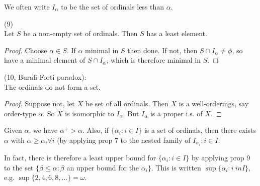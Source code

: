 \documentclass[a4paper]{article}
\begin{document}
We often write $I_\alpha$ to be the set of ordinals less than $\alpha$.

\begin{prop} (9)\\
Let $S$ be a non-empty set of ordinals. Then $S$ has a least element.
\begin{proof}
Choose $\alpha \in S$. If $\alpha$ minimal in $S$ then done. If not, then $S \cap I_\alpha \neq \phi$, so have a minimal element of $S\cap I_\alpha$, which is therefore minimal in $S$.
\end{proof}
\end{prop}

\begin{thm} (10, Burali-Forti paradox):\\
The ordinals do not form a set.
\begin{proof}
Suppose not, let $X$ be set of all ordinals. Then $X$ is a well-orderings, say order-type $\alpha$. So $X$ is isomorphic to $I_\alpha$. But $I_\alpha$ is a proper i.s. of $X$.
\end{proof}
\end{thm}

Given $\alpha$, we have $\alpha^+ > \alpha$. Also, if $\{\alpha_i:i \in I\}$ is a set of ordinals, then there exists $\alpha$ with $\alpha \geq \alpha_i \forall i$ (by applying prop 7 to the nested family of $I_{\alpha_i};i \in I$.

In fact, there is therefore a least upper bound for $\{\alpha_i: i \in I\}$ by applying prop 9 to the set $\{\beta \leq \alpha: \beta$ an upper bound for the $\alpha_i\}$. This is written $\sup\{\alpha_i:i \
in I\}$, e.g. $\sup\{2,4,6,8,...\} = \omega$.

\iffalse
\begin{equation*}
\begin{aligned}

\end{aligned}
\end{equation*}
\fi
\end{document}
